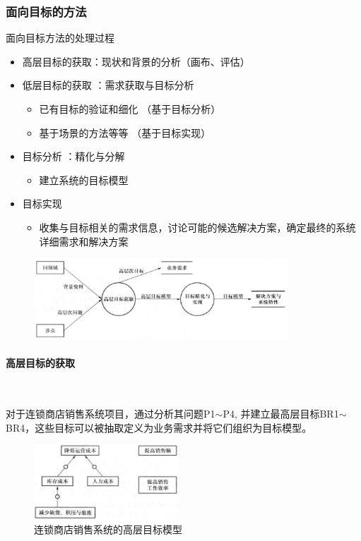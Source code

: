 \subsubsection{面向目标的方法}
面向目标方法的处理过程 
\begin{itemize}
    \item 高层目标的获取：现状和背景的分析（画布、评估）
    \item 低层目标的获取 ：需求获取与目标分析
    \begin{itemize}
        \item 已有目标的验证和细化 （基于目标分析）
        \item 基于场景的方法等等 （基于目标实现）
    \end{itemize}
    \item 目标分析 ：精化与分解
    \begin{itemize}
        \item 建立系统的目标模型 
    \end{itemize}
    \item 目标实现 
    \begin{itemize}
        \item 收集与目标相关的需求信息，讨论可能的候选解决方案，确定最终的系统详细需求和解决方案 
    \end{itemize}
\end{itemize}

\begin{figure}[H]
	\centering
	\includegraphics[width=0.85\textwidth]{img/目标分析过程.png}
\end{figure}

\paragraph{高层目标的获取}~{} \par
对于连锁商店销售系统项目，通过分析其问题P1$\sim$P4, 并建立最高层目标BR1$\sim$BR4，这些目标可以被抽取定义为业务需求并将它们组织为目标模型。

\begin{figure}[H]
	\centering
	\includegraphics[width=0.48\textwidth]{img/连锁商店销售系统的高层目标模型.png}
    \caption*{连锁商店销售系统的高层目标模型}
\end{figure}
\vspace{-1em}


